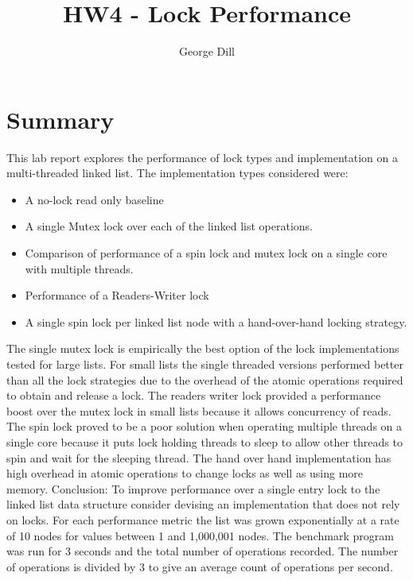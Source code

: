\documentclass{article}
\title{HW4 - Lock Performance}
\author{George Dill}
\begin{document}
\maketitle

\section{Summary}
This lab report explores the performance of lock types and implementation on a multi-threaded 
linked list. The implementation types considered were:
	\begin{itemize}
		\item A no-lock read only baseline
		\item A single Mutex lock over each of the linked list operations. 
		\item Comparison of performance of a spin lock and mutex lock on a single core 
				with multiple threads. 
		\item Performance of a Readers-Writer lock
		\item A single spin lock per linked list node with a hand-over-hand locking strategy. 
	\end{itemize}
The single mutex lock is empirically the best option of the lock implementations tested 
for large lists. For small lists the single threaded versions performed better than all 
the lock strategies due to the overhead of the atomic operations required to obtain and 
release a lock. The readers writer lock provided a performance boost over the mutex lock 
in small lists because it allows concurrency of reads. The spin lock proved to be a poor 
solution when operating multiple threads on a single core because it puts lock holding 
threads to sleep to allow other threads to spin and wait for the sleeping thread. The 
hand over hand implementation has high overhead in atomic operations to change locks as 
well as using more memory. 
\newline
\newline
Conclusion: To improve performance over a single entry lock to the linked list data 
structure consider devising an implementation that does not rely on locks.  
\newline
\newline
For each performance metric the list was grown exponentially at a rate of 10 nodes for 
values between 1 and 1,000,001 nodes. The benchmark program was run for 3 seconds and the 
total number of operations recorded. The number of operations is divided by 3 to give an 
average count of operations per second.
\end{document}
